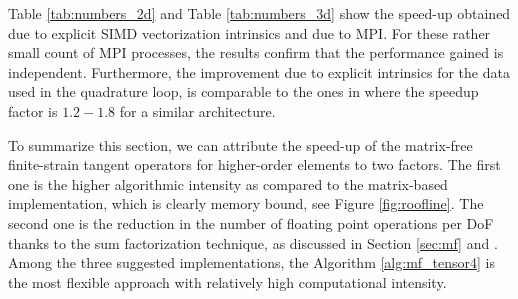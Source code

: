 \documentclass[times,doublespace]{nmeauth}
\begin{document}
\begin{table}
  \centering
  \caption{Wall-clock time in seconds and performance in GFlops of Algorithm \ref{alg:mf_tensor4} in 3D for various combinations of polynomial degrees,
  vectorization and parallelization.}
  \label{tab:numbers_3d}
\end{table}

Table \ref{tab:numbers_2d} and Table \ref{tab:numbers_3d} show the speed-up obtained due to explicit SIMD vectorization intrinsics and due to MPI. For these rather small count of MPI processes, the results confirm that the performance gained is independent. Furthermore, the improvement due to explicit intrinsics for the data used in the quadrature loop, is comparable to the ones in \cite[Figure 6]{kronbichler2017fastcomputer} where the speedup factor is $1.2-1.8$ for a similar architecture.

To summarize this section, we can attribute the speed-up of the matrix-free finite-strain tangent operators for higher-order elements to two factors.
The first one is the higher algorithmic intensity as compared to the matrix-based implementation, which is clearly memory
bound, see Figure \ref{fig:roofline}.
The second one is the reduction in the number of floating point operations per DoF thanks to the sum factorization technique, as discussed in
Section \ref{sec:mf} and \cite[Section 2.4]{kronbichler12}.
Among the three suggested implementations, the Algorithm \ref{alg:mf_tensor4} is the most flexible approach with relatively high computational intensity.
\end{document}
